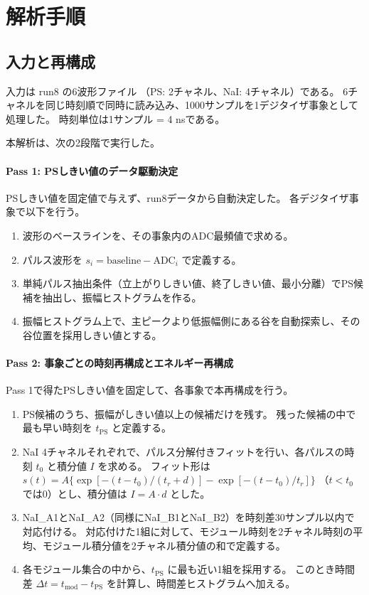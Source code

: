 \documentclass[a4paper,11pt]{jsarticle}
\begin{document}
\section{解析手順}
\subsection{入力と再構成}
入力は run8 の6波形ファイル
（PS: 2チャネル、NaI: 4チャネル）である。
6チャネルを同じ時刻順で同時に読み込み、1000サンプルを1デジタイザ事象として処理した。
時刻単位は1サンプル = 4 nsである。

本解析は、次の2段階で実行した。

\paragraph{Pass 1: PSしきい値のデータ駆動決定}
PSしきい値を固定値で与えず、run8データから自動決定した。
各デジタイザ事象で以下を行う。
\begin{enumerate}
  \item 波形のベースラインを、その事象内のADC最頻値で求める。
  \item パルス波形を $s_i = \mathrm{baseline} - \mathrm{ADC}_i$ で定義する。
  \item 単純パルス抽出条件（立上がりしきい値、終了しきい値、最小分離）でPS候補を抽出し、振幅ヒストグラムを作る。
  \item 振幅ヒストグラム上で、主ピークより低振幅側にある谷を自動探索し、その谷位置を採用しきい値とする。
\end{enumerate}

\paragraph{Pass 2: 事象ごとの時刻再構成とエネルギー再構成}
Pass 1で得たPSしきい値を固定して、各事象で本再構成を行う。
\begin{enumerate}
  \item PS候補のうち、振幅がしきい値以上の候補だけを残す。
  残った候補の中で最も早い時刻を $t_{\mathrm{PS}}$ と定義する。
  \item NaI 4チャネルそれぞれで、パルス分解付きフィットを行い、各パルスの時刻 $t_0$ と積分値 $I$ を求める。
  フィット形は
  \(
    s(t)=A\{\exp[-(t-t_0)/(t_r+d)]-\exp[-(t-t_0)/t_r]\}
  \)
  （$t<t_0$ では0）とし、積分値は $I=A\cdot d$ とした。
  \item NaI\_A1とNaI\_A2（同様にNaI\_B1とNaI\_B2）を時刻差30サンプル以内で対応付ける。
  対応付けた1組に対して、モジュール時刻を2チャネル時刻の平均、モジュール積分値を2チャネル積分値の和で定義する。
  \item 各モジュール集合の中から、$t_{\mathrm{PS}}$ に最も近い1組を採用する。
  このとき時間差
  \(
    \Delta t = t_{\mathrm{mod}} - t_{\mathrm{PS}}
  \)
  を計算し、時間差ヒストグラムへ加える。
\end{enumerate}
\end{document}
